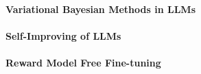 \paragraph{Variational Bayesian Methods in LLMs}


\paragraph{Self-Improving of LLMs}
\paragraph{Reward Model Free Fine-tuning}
